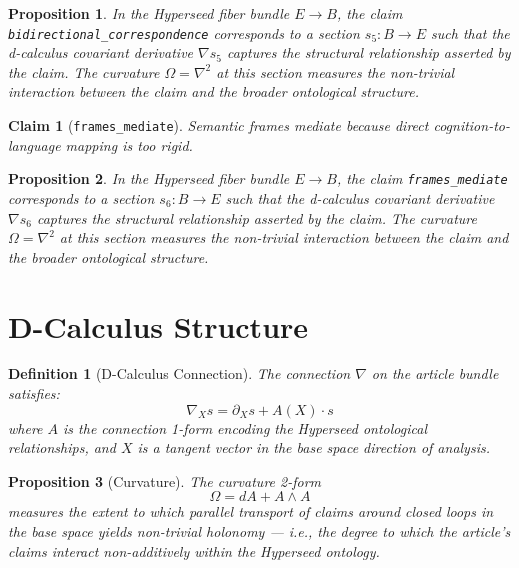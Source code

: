 \documentclass{article}
\newtheorem{claim}{Claim}
\newtheorem{definition}{Definition}
\newtheorem{proposition}{Proposition}
\begin{document}
\begin{proposition}
In the Hyperseed fiber bundle $E \to B$, the claim \texttt{bidirectional_correspondence} corresponds to a section $s_5: B \to E$ such that the d-calculus covariant derivative $\nabla s_5$ captures the structural relationship asserted by the claim. The curvature $\Omega = \nabla^2$ at this section measures the non-trivial interaction between the claim and the broader ontological structure.
\end{proposition}

\begin{claim}[\texttt{frames_mediate}]
Semantic frames mediate because direct cognition-to-language mapping is too rigid.
\end{claim}

\begin{proposition}
In the Hyperseed fiber bundle $E \to B$, the claim \texttt{frames_mediate} corresponds to a section $s_6: B \to E$ such that the d-calculus covariant derivative $\nabla s_6$ captures the structural relationship asserted by the claim. The curvature $\Omega = \nabla^2$ at this section measures the non-trivial interaction between the claim and the broader ontological structure.
\end{proposition}

\section{D-Calculus Structure}

\begin{definition}[D-Calculus Connection]
The connection $\nabla$ on the article bundle satisfies:
\begin{equation}
  \nabla_X s = \partial_X s + A(X) \cdot s
\end{equation}
where $A$ is the connection 1-form encoding the Hyperseed ontological relationships, and $X$ is a tangent vector in the base space direction of analysis.
\end{definition}

\begin{proposition}[Curvature]
The curvature 2-form
\begin{equation}
  \Omega = dA + A \wedge A
\end{equation}
measures the extent to which parallel transport of claims around closed loops in the base space yields non-trivial holonomy --- i.e., the degree to which the article's claims interact non-additively within the Hyperseed ontology.
\end{proposition}
\end{document}
